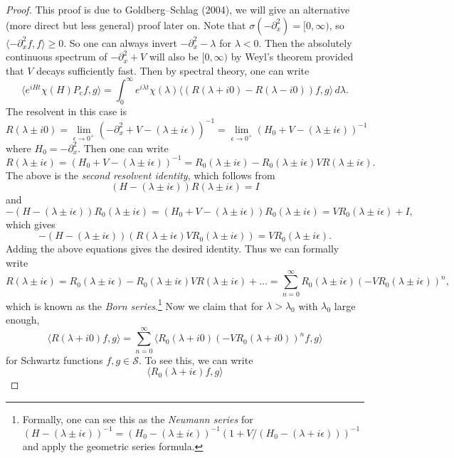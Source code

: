 \begin{proof}
  This proof is due to Goldberg--Schlag (2004), we
  will give an alternative (more direct but less
  general) proof later on. Note that
  $\sigma(-\partial_x^2) = [0, \infty)$, so
  $\langle -\partial_x^2 f, f \rangle \ge 0$.
  So one can always invert $-\partial_x^2 - \lambda$
  for $\lambda < 0$.
  Then the absolutely continuous spectrum of
  $-\partial_x^2 + V$ will also be $[0, \infty)$
  by Weyl's theorem provided that $V$ decays
  sufficiently fast. Then by spectral theory,
  one can write
  \[
    \langle e^{iHt} \chi(H) P_{\mathrm{c}} f, g \rangle
    = \int_0^\infty  e^{i\lambda t} \chi(\lambda) \langle (R(\lambda + i0) - R(\lambda - i0)) f, g \rangle\, d\lambda.
  \]
  The resolvent in this case is
  \[
    R(\lambda \pm i 0)
    = \lim_{\epsilon \to 0^+}
    (-\partial_x^2 + V - (\lambda \pm i \epsilon))^{-1}
    = \lim_{\epsilon \to 0^+}
    (H_0 + V - (\lambda \pm i \epsilon))^{-1}
  \]
  where $H_0 = -\partial_x^2$. Then one can write
  \[
    R(\lambda \pm i\epsilon)
    = (H_0 + V - (\lambda \pm i \epsilon))^{-1}
    = R_0(\lambda \pm i\epsilon) - R_0(\lambda \pm i\epsilon) V R(\lambda \pm i\epsilon).
  \]
  The above is the \emph{second resolvent identity},
  which follows from
  \[
    (H - (\lambda \pm i \epsilon)) R(\lambda \pm i \epsilon) = I
  \]
  and
  \[
    -(H - (\lambda \pm i \epsilon)) R_0(\lambda \pm i \epsilon)
    = (H_0 + V - (\lambda \pm i \epsilon)) R_0(\lambda \pm i \epsilon)
    = V R_0(\lambda \pm i \epsilon) + I,
  \]
  which gives
  \[
    -(H - (\lambda \pm i \epsilon)) (R(\lambda \pm i \epsilon) V R_0(\lambda \pm i \epsilon))
    = V R_0(\lambda \pm i \epsilon).
  \]
  Adding the above equations gives the desired
  identity. Thus we can formally write
  \[
    R(\lambda \pm i \epsilon)
    = R_0(\lambda \pm i \epsilon)
    - R_0 (\lambda \pm i \epsilon) V R(\lambda \pm i \epsilon)
    + \dots
    = \sum_{n = 0}^\infty R_0(\lambda \pm i \epsilon) (-V R_0(\lambda \pm i \epsilon))^n,
  \]
  which is known as the \emph{Born series}.\footnote{Formally, one can see this as the \emph{Neumann series} for $(H - (\lambda \pm i \epsilon))^{-1} = (H_0 - (\lambda \pm i \epsilon))^{-1} (1 + V / (H_0 - (\lambda + i\epsilon)))^{-1}$ and apply the geometric series formula.}
  Now we claim that for $\lambda > \lambda_0$ with
  $\lambda_0$ large enough,
  \[
    \langle R(\lambda + i 0)f, g \rangle
    = \sum_{n = 0}^\infty \langle R_0(\lambda + i 0) (-V R_0(\lambda + i 0))^n f, g \rangle
  \]
  for Schwartz functions $f, g \in \mathcal{S}$. To
  see this, we can write
  \[
    \langle R_0(\lambda + i\epsilon) f, g \rangle
\]
\end{proof}
